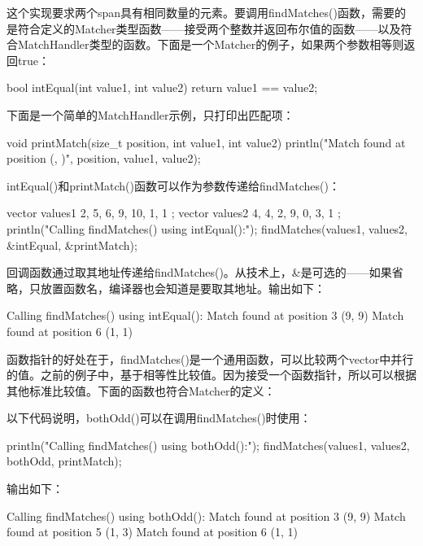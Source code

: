 这个实现要求两个span具有相同数量的元素。要调用findMatches()函数，需要的是符合定义的Matcher类型函数——接受两个整数并返回布尔值的函数——以及符合MatchHandler类型的函数。下面是一个Matcher的例子，如果两个参数相等则返回true：

\begin{cpp}
bool intEqual(int value1, int value2) { return value1 == value2; }
\end{cpp}

下面是一个简单的MatchHandler示例，只打印出匹配项：

\begin{cpp}
void printMatch(size_t position, int value1, int value2)
{
    println("Match found at position {} ({}, {})", position, value1, value2);
}
\end{cpp}

intEqual()和printMatch()函数可以作为参数传递给findMatches()：

\begin{cpp}
vector values1 { 2, 5, 6, 9, 10, 1, 1 };
vector values2 { 4, 4, 2, 9, 0, 3, 1 };
println("Calling findMatches() using intEqual():");
findMatches(values1, values2, &intEqual, &printMatch);
\end{cpp}

回调函数通过取其地址传递给findMatches()。从技术上，\&是可选的——如果省略，只放置函数名，编译器也会知道是要取其地址。输出如下：

\begin{shell}
Calling findMatches() using intEqual():
Match found at position 3 (9, 9)
Match found at position 6 (1, 1)
\end{shell}

函数指针的好处在于，findMatches()是一个通用函数，可以比较两个vector中并行的值。之前的例子中，基于相等性比较值。因为接受一个函数指针，所以可以根据其他标准比较值。下面的函数也符合Matcher的定义：


以下代码说明，bothOdd()可以在调用findMatches()时使用：

\begin{cpp}
println("Calling findMatches() using bothOdd():");
findMatches(values1, values2, bothOdd, printMatch);
\end{cpp}

输出如下：

\begin{shell}
Calling findMatches() using bothOdd():
Match found at position 3 (9, 9)
Match found at position 5 (1, 3)
Match found at position 6 (1, 1)
\end{shell}

